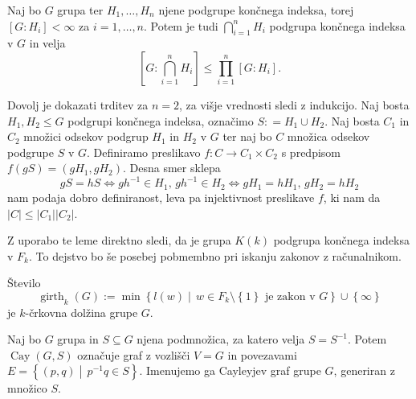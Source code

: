 \documentclass[mat1, tisk]{fmfdelo}
\numberwithin{equation}{section}  %
\begin{document}
\begin{lema}\label{lem_koncni_indeks_koncnega_preseka}
Naj bo $G$ grupa ter $H_1, \ldots, H_n$ njene podgrupe končnega indeksa, torej $[G: H_i] < \infty$ za $i = 1, \ldots, n$. Potem je tudi $\bigcap_{i = 1}^{n} H_i$ podgrupa končnega indeksa v $G$ in velja
\begin{equation*}
\left[ G: \bigcap_{i = 1}^{n} H_i \right]  \le \prod_{i=1}^{n} [G: H_i].  
\end{equation*} 
\end{lema}

\begin{dokaz}
Dovolj je dokazati trditev za $n = 2$, za višje vrednosti sledi z indukcijo. Naj bosta $H_1, H_2 \le G$ podgrupi končnega indeksa, označimo $S: = H_1 \cup H_2$. Naj bosta $C_1$ in $C_2$ množici odsekov podgrup $H_1$ in $H_2$ v $G$ ter naj bo $C$ množica odsekov podgrupe $S$ v $G$. Definiramo preslikavo $f : C \to  C_1 \times C_2$ s predpisom $f(g S ) = (g H_1, g H_2)$. Desna smer sklepa \begin{equation*}
 g S = h S \iff gh^{-1} \in H_1, \, gh^{-1} \in H_2  \iff g H_1 = h H_1, \, g H_2 = h H_2
\end{equation*}  
nam podaja dobro definiranost, leva pa injektivnost preslikave $f$, ki nam da $\lvert C \rvert \le  \lvert C_1 \rvert \lvert C_2 \rvert $.    
\end{dokaz}
Z uporabo te leme direktno sledi, da je grupa $K(k)$ podgrupa končnega indeksa v $F_k$. To dejstvo bo še posebej pobmembno pri iskanju zakonov z računalnikom.

\begin{definicija}\label{def_ozina}
Število \begin{equation*}
\operatorname{girth}_{k}(G) := \min \left\{ l(w)  \middle|\,  w \in F_k \setminus \left\{ 1\right\} \text{ je zakon v } G  \right\} \cup \left\{ \infty\right\} 
\end{equation*}  
je $k$-črkovna dolžina grupe $G$.  
\end{definicija}


\begin{definicija}
\label{def_cayleyev_graf}
Naj bo $G$ grupa in $S \subseteq G$ njena podmnožica, za katero velja $S = S^{-1}$. Potem $\operatorname{Cay}(G, S)$ označuje graf z vozlišči $V = G$ in povezavami
$E = \left\{ (p, q) \middle|\, p^{-1}q \in  S \right\}$. Imenujemo ga Cayleyjev graf grupe $G$, generiran z množico $S$.  
\end{definicija}
\end{document}
